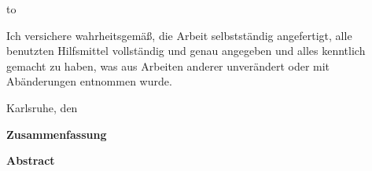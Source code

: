 \thispagestyle{empty}
\vspace*{42\baselineskip}
\hbox to \textwidth{\hrulefill}
\par
Ich versichere wahrheitsgemäß, die Arbeit selbstständig angefertigt, alle benutzten Hilfsmittel vollständig und genau angegeben und alles kenntlich gemacht zu haben, was aus Arbeiten anderer unverändert oder mit Abänderungen entnommen wurde.

Karlsruhe, den 

\cleardoublepage

\vspace*{1em}
\begin{center}
	\textbf{Zusammenfassung}
\end{center}
\par
{}
\cleardoublepage
\vspace*{1em}
\begin{center}
	\textbf{Abstract}
\end{center}
\par
{}

\cleardoublepage

